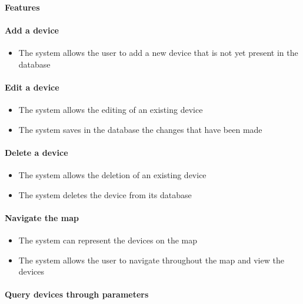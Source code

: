 \paragraph*{Features}

\paragraph*{Add a device}

\begin{itemize}
    \item The system allows the user to add a new device that is not yet present in the database
\end{itemize}

\paragraph*{Edit a device}

\begin{itemize}
    \item The system allows the editing of an existing device
    \item The system saves in the database the changes that have been made
\end{itemize}

\paragraph*{Delete a device}

\begin{itemize}
    \item The system allows the deletion of an existing device
    \item The system deletes the device from its database
\end{itemize}

\paragraph*{Navigate the map}

\begin{itemize}
    \item The system can represent the devices on the map
    \item The system allows the user to navigate throughout the map and view the devices
\end{itemize}

\paragraph*{Query devices through parameters}

